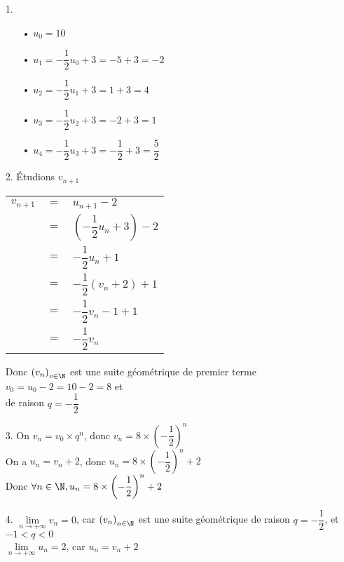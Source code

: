 \begin{itemize}
\item[1.]
\begin{itemize}
\item[•] $u_0 = 10$ \\
\item[•] $u_1 = -\dfrac{1}{2} u_0 + 3 = -5 + 3 = -2$ \\
\item[•] $u_2 = -\dfrac{1}{2} u_1 + 3 = 1 + 3 = 4$ \\
\item[•] $u_3 = -\dfrac{1}{2} u_2 + 3 = -2 + 3 = 1$ \\
\item[•] $u_4 = -\dfrac{1}{2} u_3 + 3 = -\dfrac{1}{2} + 3 = \dfrac{5}{2}$ \\
\end{itemize}
\item[2.] Étudions $v_{n+1}$ \\
\begin{tabular}{lll}
$v_{n+1}$ & $=$ & $u_{n+1} -2$ \vspace*{.3cm} \\
& $=$ & $\left(-\dfrac{1}{2}u_n + 3\right)-2$ \vspace*{.3cm} \\
& $=$ & $-\dfrac{1}{2}u_n +1$ \vspace*{.3cm} \\
& $=$ & $-\dfrac{1}{2} \left(v_n + 2\right) + 1$ \vspace*{.3cm} \\
& $=$ & $-\dfrac{1}{2} v_n - 1 + 1$ \vspace*{.3cm} \\
& $=$ & $-\dfrac{1}{2} v_n$ \\
\end{tabular}
\vspace*{.3cm}

Donc $\left(v_n\right)_{v \in \N}$ est une suite géométrique de premier terme $v_0 = u_0 - 2 = 10 - 2 = 8$ et \\ de raison $q = -\dfrac{1}{2}$ \vspace*{.3cm} \\

\item[3.] On $v_n = v_0 \times q^n$, donc $v_n = 8 \times \left(-\dfrac{1}{2}\right)^n$ \\

On a $u_n = v_n + 2$, donc $u_n = 8 \times \left(-\dfrac{1}{2}\right)^n + 2$ \\

Donc $\forall n \in \N, u_n = 8 \times \left(-\dfrac{1}{2}\right)^n + 2$ \\

\item[4.] $\lim\limits_{n \to +\infty} v_n = 0$, car $\left(v_n\right)_{n \in \N}$ est une suite géométrique de raison $q = -\dfrac{1}{2}$, et $ -1 < q < 0$ \\

$\lim\limits_{n \to +\infty} u_n = 2$, car $u_n = v_n + 2$ 
\end{itemize}

\vspace*{-5cm}


\ifdefined\COMPLETE
\else
    
\fi